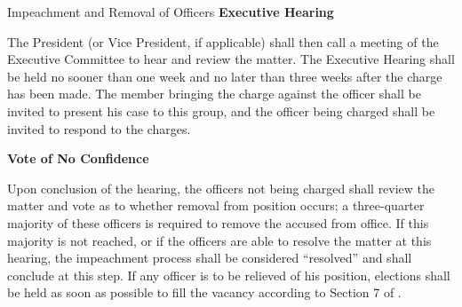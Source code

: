 {\begin{article}{Impeachment and Removal of Officers}
		\hypertarget{Executive Hearing}{}
		\textbf{Executive Hearing}
	
		\begin{adjustwidth*}{2em}{}
			The President (or Vice President, if applicable) shall then call a meeting of the Executive Committee to hear and review the matter. The Executive Hearing shall be held no sooner than one week and no later than three weeks after the charge has been made. The member bringing the charge against the officer shall be invited to present his case to this group, and the officer being charged shall be invited to respond to the charges.
		\end{adjustwidth*}
	
		\hypertarget{Vote of No Confidence}{}
		\textbf{Vote of No Confidence}
		
		\begin{adjustwidth*}{2em}{}
			Upon conclusion of the hearing, the officers not being charged shall review the matter and vote as to whether removal from position occurs; a three-quarter majority of these officers is required to remove the accused from office. If this majority is not reached, or if the officers are able to resolve the matter at this hearing, the impeachment process shall be considered \enquote{resolved} and shall conclude at this step. If any officer is to be relieved of his position, elections shall be held as soon as possible to fill the vacancy according to Section 7 of .
		\end{adjustwidth*}
	\end{article}
}